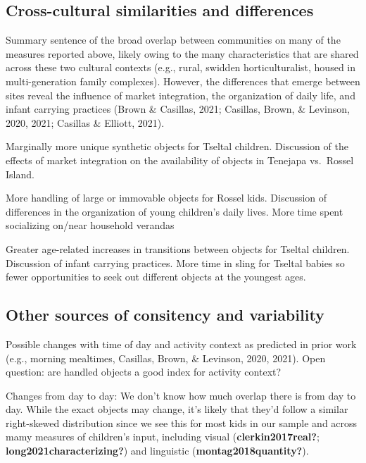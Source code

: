 \documentclass[10pt, letterpaper]{article}
\begin{document}
\hypertarget{cross-cultural-similarities-and-differences}{%
\subsection{Cross-cultural similarities and
differences}\label{cross-cultural-similarities-and-differences}}

Summary sentence of the broad overlap between communities on many of the
measures reported above, likely owing to the many characteristics that
are shared across these two cultural contexts (e.g., rural, swidden
horticulturalist, housed in multi-generation family complexes). However,
the differences that emerge between sites reveal the influence of market
integration, the organization of daily life, and infant carrying
practices (Brown \& Casillas, 2021; Casillas, Brown, \& Levinson, 2020,
2021; Casillas \& Elliott, 2021).

Marginally more unique synthetic objects for Tseltal children.
Discussion of the effects of market integration on the availability of
objects in Tenejapa vs.~Rossel Island.

More handling of large or immovable objects for Rossel kids. Discussion
of differences in the organization of young children's daily lives. More
time spent socializing on/near household verandas

Greater age-related increases in transitions between objects for Tseltal
children. Discussion of infant carrying practices. More time in sling
for Tseltal babies so fewer opportunities to seek out different objects
at the youngest ages.

\hypertarget{other-sources-of-consitency-and-variability}{%
\subsection{Other sources of consitency and
variability}\label{other-sources-of-consitency-and-variability}}

Possible changes with time of day and activity context as predicted in
prior work (e.g., morning mealtimes, Casillas, Brown, \& Levinson, 2020,
2021). Open question: are handled objects a good index for activity
context?

Changes from day to day: We don't know how much overlap there is from
day to day. While the exact objects may change, it's likely that they'd
follow a similar right-skewed distribution since we see this for most
kids in our sample and across mamy measures of children's input,
including visual (\textbf{clerkin2017real?};
\textbf{long2021characterizing?}) and linguistic
(\textbf{montag2018quantity?}).
\end{document}
